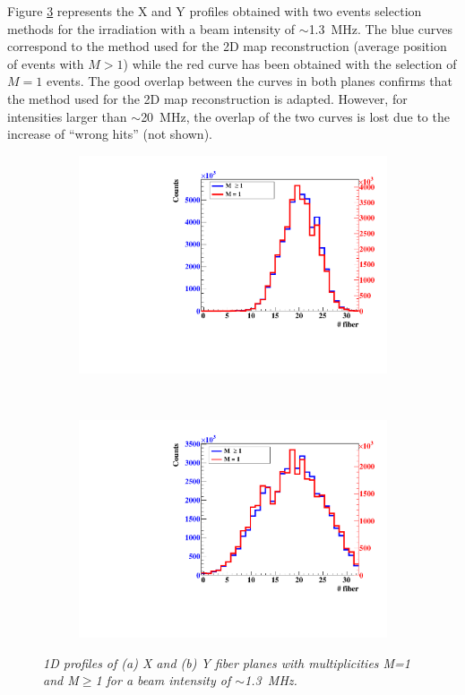 \documentclass[a4paper,11pt]{article}
\begin{document}
Figure \ref{fig:1D_Profiles} represents the X and Y profiles obtained with two events selection methods for the irradiation with a beam intensity of $\sim$1.3~MHz. The blue curves correspond to the method used  for the 2D map reconstruction (average position of events with $M>1$) while the red curve has been obtained with the selection of $M=1$ events. The good overlap between the curves in both planes confirms that the method used for the 2D map reconstruction is adapted. However, for intensities larger than $\sim$20~MHz, the overlap of the two curves is lost due to the increase of \enquote{wrong hits} (not shown).

\begin{figure}[htb]
\centering
    \begin{subfigure}{0.47\textwidth} \centering \includegraphics[width=\textwidth]{figures/Plane_X_1MHz.pdf} \caption{} \label{fig:Plane_X_1MHz}
    \end{subfigure}
    ~
    \begin{subfigure}{0.47\textwidth} \centering \includegraphics[width=\textwidth]{figures/Plane_Y_1MHz.pdf} \caption{} \label{fig:Plane_Y_1MHz}
    \end{subfigure}
\caption{\small{\textit{1D profiles of (a) X and (b) Y fiber planes with multiplicities M=1 and M$\geq$1 for a beam intensity of $\sim${1.3}~MHz.}}}
\label{fig:1D_Profiles}
\end{figure}
\end{document}
